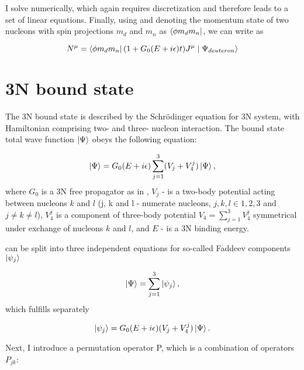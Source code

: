     I solve  numerically, which again requires discretization
    and therefore leads to a set of linear equations.
    Finally, using  and denoting the momentum state of two nucleons
    with spin projections $m_d$ and $m_n$ as $\bra{\phi m_d m_n}$, we can write  as
    
    \begin{equation}
        N^\mu = \bra{\phi m_d m_n} (1 + G_0(E + i\epsilon) t) J^\mu \mid \Psi_{deuteron} \rangle
        \label{main_top}
    \end{equation}

    
\section{3N bound state}

    The 3N bound state is described by the Schr\"{o}dinger equation for 3N system,
    with Hamiltonian comprising two- and three- nucleon interaction.
    The bound state total wave function $\ket{\Psi}$ obeys the following equation:

    \begin{equation}
        \ket{\Psi} = G_0(E+i\epsilon)\sum_{j=1}^3 (V_j + V_4^j) \ket{\Psi},
        \label{psi3_total}
    \end{equation}
    where $G_0$ is a 3N free propagator as in , $V_j$ - is a two-body potential
    acting between nucleons $k$ and $l$ (j, k and l - numerate nucleons, $j,k,l \in {1,2,3}$ and $j \neq k \neq l$),
    $V_4^j$ is a component of three-body potential $V_4 = \sum_{j=1}^3 V_4^j$
    symmetrical under exchange of nucleons $k$ and $l$,
    and $E$ - is a 3N binding energy.

     can be split into three independent equations for
    so-called Faddeev components $\ket{\psi_j}$

    \begin{equation}
        \ket{\Psi} = \sum_{j=1}^3 \ket{\psi_j},
        \label{faddeev_comps}
    \end{equation}
    which fulfills separately

    \begin{equation}
        \ket{\psi_j} = G_0(E+i\epsilon)(V_j + V_4^j) \ket{\Psi}.
        \label{psi3_component}
    \end{equation}

    Next, I introduce a permutation operator P, which is a combination
    of operators $P_{jk}$:
    
